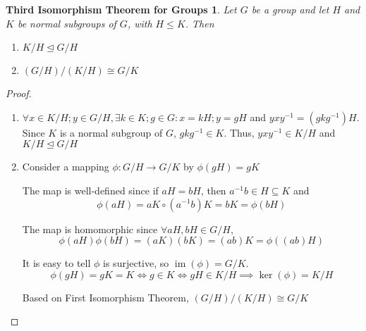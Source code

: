 \documentclass{article}
\newtheorem*{thm}{Third Isomorphism Theorem for Groups}
\theoremstyle{definition}\newtheorem{definition}{Definition}
\begin{document}
	\begin{thm}
		Let $G$ be a group and let $H$ and $K$ be normal subgroups of $G$, with $H \leq K$. Then 
		\begin{enumerate}
			\item $K / H \unlhd G / H$
			\item $( G / H ) / ( K / H ) \cong G / K$
		\end{enumerate}
	\end{thm}
	\begin{proof}
		\
		\begin{enumerate}
			\item $\forall x \in K/H; y \in G/H, \exists k \in K; g \in G : x=kH; y=gH $ and $yxy^{-1}=(gkg^{-1})H$. Since $K$ is a normal subgroup of $G$, $gkg^{-1} \in K$. Thus, $yxy^{-1} \in K/H$ and $K / H \unlhd G / H$
			\item Consider a mapping $\phi : G/H \rightarrow G/K$ by $\phi(gH)=gK$
			
			The map is well-defined since if $aH=bH$, then $a^{-1}b\in H \subseteq K $ and
			$$\phi(aH)=aK \circ (a^{-1}b) K = bK=\phi(bH)$$
			
			The map is homomorphic since $\forall aH, bH \in G/H$, $$\phi(aH)\phi(bH)=(aK)(bK)=(ab)K=\phi((ab)H)$$
			
			It is easy to tell $\phi$ is surjective, so $\operatorname { im } ( \phi )=G/K$. 
			$$\phi(gH)=gK=K \iff g\in K \iff gH \in K/H \implies \operatorname { ker } ( \phi )=K/H $$
			
			Based on First Isomorphism Theorem, $( G / H ) / ( K / H ) \cong G / K$
		\end{enumerate}
	\end{proof}		
\end{document}
